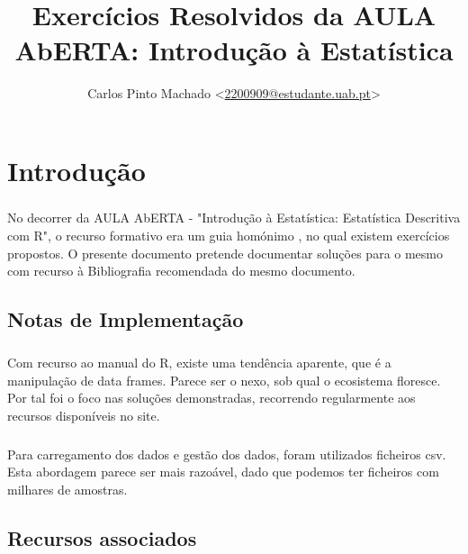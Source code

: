 \documentclass[11pt,a4paper]{report}
\author{Carlos Pinto Machado
	<\href{mailto:2200909@estudante.uab.pt}{2200909@estudante.uab.pt}>}
\title{Exercícios Resolvidos da AULA AbERTA: Introdução à Estatística}
\begin{document}
\maketitle
\tableofcontents

\clearpage

\chapter*{Introdução}

\paragraph{} No decorrer da AULA AbERTA - "Introdução à Estatística:
Estatística Descritiva com R"\cite{AulaAbertaIntroducaoEstatistica2017}, o
recurso formativo era um guia homónimo
\cite{OliveiraAulaAberta2017}, no qual existem
exercícios propostos. O presente documento pretende documentar soluções para o
mesmo com recurso à Bibliografia recomendada do mesmo
documento\cite{OliveiraEstatisticaDescritiva2011}.

\section*{Notas de Implementação}

\paragraph{} Com recurso ao manual do R\cite{RManual}, existe uma tendência
aparente, que é a manipulação de data frames. Parece ser o nexo, sob qual o
ecosistema floresce. Por tal foi o foco nas soluções demonstradas, recorrendo
regularmente aos recursos disponíveis no site.

\paragraph{} Para carregamento dos dados e gestão dos dados, foram utilizados
ficheiros csv. Esta abordagem parece ser mais razoável, dado que
podemos ter ficheiros com milhares de amostras.


\section*{Recursos associados}
\end{document}
